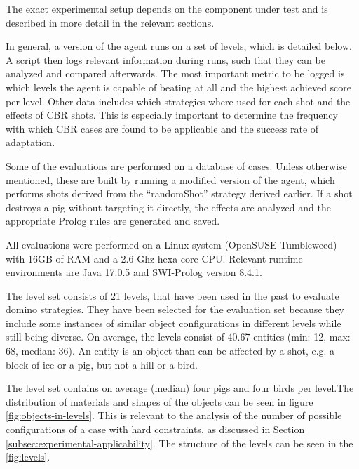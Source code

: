 The exact experimental setup depends on the component under test and is described in more detail in the relevant sections.

In general, a version of the agent runs on a set of levels, which is detailed below.
A script then logs relevant information during runs, such that they can be analyzed and compared afterwards.
The most important metric to be logged is which levels the agent is capable of beating at all and the highest achieved score per level.
Other data includes which strategies where used for each shot and the effects of \ac{CBR} shots.
This is especially important to determine the frequency with which \acs{CBR} cases are found to be applicable and the success rate of adaptation.

Some of the evaluations are performed on a database of cases. Unless otherwise mentioned, these are built by running a modified version of the agent, which performs shots derived from the ``randomShot'' strategy derived earlier. If a shot destroys a pig without targeting it directly, the effects are analyzed and the appropriate Prolog rules are generated and saved.

All evaluations were performed on a Linux system (OpenSUSE Tumbleweed) with 16GB of RAM and a 2.6 Ghz hexa-core CPU. Relevant runtime environments are Java 17.0.5 and SWI-Prolog version 8.4.1.

The level set consists of 21 levels, that have been used in the past to evaluate domino strategies. They have been selected for the evaluation set because they include some instances of similar object configurations in different levels while still being diverse.
On average, the levels consist of 40.67 entities (min: 12, max: 68, median: 36). An entity is an object than can be affected by a shot, e.g. a block of ice or a pig, but not a hill or a bird.

The level set contains on average (median) four pigs and four birds per level.The distribution of materials and shapes of the objects can be seen in figure \ref{fig:objects-in-levels}. This is relevant to the analysis of the number of possible configurations of a case with hard constraints, as discussed in Section \ref{subsec:experimental-applicability}.
The structure of the levels can be seen in the \ref{fig:levels}.

